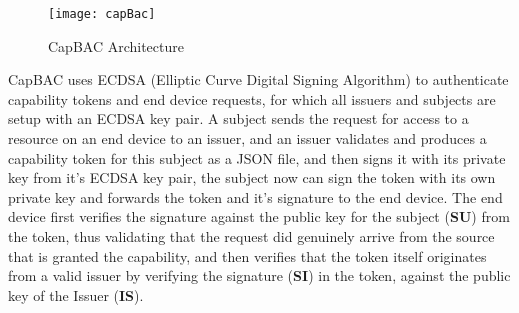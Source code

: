 \begin{figure}[h]
\centering
\texttt{[image: capBac]}
\caption{CapBAC Architecture }
\label{fig:capbac}
\end{figure}

CapBAC uses ECDSA (Elliptic Curve Digital Signing Algorithm) to authenticate capability tokens and end device requests, for which all issuers and subjects are setup with an ECDSA key pair. A subject sends the request for access to a resource on an end device to an issuer, and an issuer validates and produces a capability token for this subject as a JSON file, and then signs it with its private key from it's ECDSA key pair, the subject now can sign the token with its own private key and forwards the token and it's signature to the end device. The end device first verifies the signature against the public key for the subject (\textbf{SU}) from the token, thus validating that the request did genuinely arrive from the source that is granted the capability, and then verifies that the token itself originates from a valid issuer by verifying the signature (\textbf{SI}) in the token, against the public key of the Issuer (\textbf{IS}).

